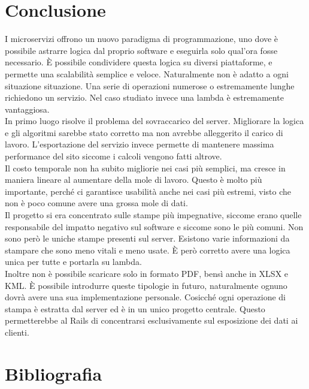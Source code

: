 \documentclass[12pt]{article}
\begin{document}
\thispagestyle{empty}
\newpage 

\section*{Conclusione}
I microservizi offrono un nuovo paradigma di programmazione, uno dove è possibile 
astrarre logica dal proprio software e eseguirla solo qual'ora fosse necessario. 
È possibile condividere questa logica su diversi piattaforme, e permette una 
scalabilità semplice e veloce.
Naturalmente non è adatto a ogni situazione situazione. Una serie di operazioni 
numerose o estremamente lunghe richiedono un servizio. 
Nel caso studiato invece una lambda è estremamente vantaggiosa.
\\ In primo luogo risolve il problema del sovraccarico del server. Migliorare la 
logica e gli algoritmi sarebbe stato corretto ma non avrebbe alleggerito il carico 
di lavoro. L'esportazione del servizio invece permette di mantenere massima 
performance del sito siccome i calcoli vengono fatti altrove.
\\ Il costo temporale non ha subito migliorie nei casi più semplici, ma cresce 
in maniera lineare al aumentare della mole di lavoro. Questo è molto più importante, 
perché ci garantisce usabilità anche nei casi più estremi, visto che non è 
poco comune avere una grossa mole di dati. 
\\ Il progetto si era concentrato sulle stampe più impegnative, siccome erano 
quelle responsabile del impatto negativo sul software e siccome sono le più 
comuni. Non sono però le uniche stampe presenti sul server. Esistono varie 
informazioni da stampare che sono meno vitali e meno usate.
È però corretto avere una logica unica per tutte e portarla su lambda. 
\\ Inoltre non è possibile scaricare solo in formato PDF, bensì anche in XLSX e 
KML. È possibile introdurre queste tipologie in futuro, naturalmente ognuno 
dovrà avere una sua implementazione personale. 
Cosicché ogni operazione di stampa è estratta dal server ed è in un 
unico progetto centrale.
Questo permetterebbe al Rails di concentrarsi esclusivamente sul esposizione
dei dati ai clienti.

\thispagestyle{empty}
\newpage 

\section*{Bibliografia}
\end{document}
